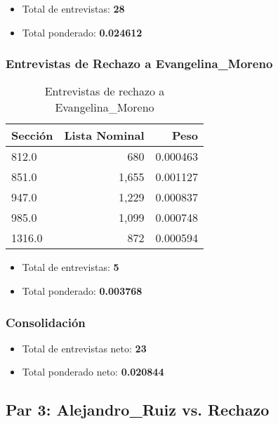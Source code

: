 \documentclass[a4paper,12pt]{article}
\begin{document}
\begin{itemize}
\item Total de entrevistas: \textbf{28}
\item Total ponderado: \textbf{0.024612}
\end{itemize}

\subsubsection*{Entrevistas de Rechazo a Evangelina_Moreno}
\begin{table}[h]
\centering
\begin{tabular}{lrr}
\toprule
Sección & Lista Nominal & Peso \\ \midrule
812.0 & 680 & 0.000463 \\ 
851.0 & 1,655 & 0.001127 \\ 
947.0 & 1,229 & 0.000837 \\ 
985.0 & 1,099 & 0.000748 \\ 
1316.0 & 872 & 0.000594 \\ 
\bottomrule
\end{tabular}
\caption{Entrevistas de rechazo a Evangelina_Moreno}
\end{table}

\begin{itemize}
\item Total de entrevistas: \textbf{5}
\item Total ponderado: \textbf{0.003768}
\end{itemize}

\subsubsection*{Consolidación}
\begin{itemize}
\item Total de entrevistas neto: \textbf{23}
\item Total ponderado neto: \textbf{0.020844}
\end{itemize}

\subsection*{Par 3: Alejandro_Ruiz vs. Rechazo}
\end{document}
